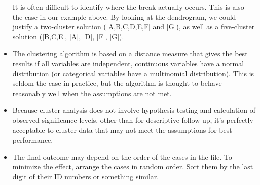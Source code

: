 \documentclass[a4paper,12pt]{article}
\begin{document}
\begin{itemize}
	It is often difficult to identify where the break actually occurs. This is also
	the case in our example above. By looking at the dendrogram, we could justify
	a two-cluster solution ([A,B,C,D,E,F] and [G]), as well as a five-cluster solution
	([B,C,E], [A], [D], [F], [G]).
	
	
	\item 
	The clustering algorithm is based on a distance measure that gives the best results if all variables are independent, continuous variables have a normal distribution (or categorical variables have a multinomial distribution). This is seldom the case in practice, but the algorithm is thought to behave reasonably well when the assumptions are not met.
	
	\item 
	Because cluster analysis does not involve hypothesis testing and calculation of observed significance levels, other than for descriptive follow-up, it's perfectly acceptable to cluster data that may not meet the assumptions for best performance.
	\item 
	The final outcome may depend on the order of the cases in the file. To minimize the effect, arrange the cases in random order. Sort them by the last digit of their ID numbers or something similar.
\end{itemize}
\end{document}
